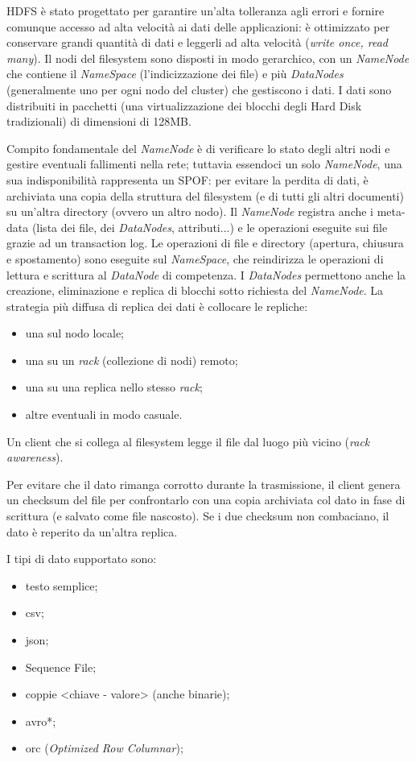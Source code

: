 \documentclass[a4page, 11pt]{article}
\begin{document}
HDFS è stato progettato per garantire un'alta tolleranza agli errori e fornire comunque accesso ad alta velocità ai dati delle applicazioni: è ottimizzato per conservare grandi quantità di dati e leggerli ad alta velocità (\textit{write once, read many}).
Il nodi del filesystem sono disposti in modo gerarchico, con un \textit{NameNode} che contiene il \textit{NameSpace} (l'indicizzazione dei file) e più \textit{DataNodes} (generalmente uno per ogni nodo del cluster) che gestiscono i dati.
I dati sono distribuiti in pacchetti (una virtualizzazione dei blocchi degli Hard Disk tradizionali) di dimensioni di 128MB.

Compito fondamentale del \textit{NameNode} è di verificare lo stato degli altri nodi e gestire eventuali fallimenti nella rete; tuttavia essendoci un solo \textit{NameNode}, una sua indisponibilità rappresenta un SPOF: per evitare la perdita di dati, è archiviata una copia della struttura del filesystem (e di tutti gli altri documenti) su un'altra directory (ovvero un altro nodo).
Il \textit{NameNode} registra anche i meta-data (lista dei file, dei \textit{DataNodes}, attributi...) e le operazioni eseguite sui file grazie ad un transaction log.
Le operazioni di file e directory (apertura, chiusura e spostamento) sono eseguite sul \textit{NameSpace}, che reindirizza le operazioni di lettura e scrittura al \textit{DataNode} di competenza.
I \textit{DataNodes} permettono anche la creazione, eliminazione e replica di blocchi sotto richiesta del \textit{NameNode}.
La strategia più diffusa di replica dei dati è collocare le repliche:
\begin{itemize}
\item una sul nodo locale;
\item una su un \textit{rack} (collezione di nodi) remoto;
\item una su una replica nello stesso \textit{rack};
\item altre eventuali in modo casuale.
\end{itemize}
Un client che si collega al filesystem legge il file dal luogo più vicino (\textit{rack awareness}).

Per evitare che il dato rimanga corrotto durante la trasmissione, il client genera un checksum del file per confrontarlo con una copia archiviata col dato in fase di scrittura (e salvato come file nascosto).
Se i due checksum non combaciano, il dato è reperito da un'altra replica.

I tipi di dato supportato sono:
\begin{itemize}
\item testo semplice;
\item csv;
\item json;
\item Sequence File;
\item coppie \textless{}chiave - valore\textgreater{} (anche binarie);
\item avro*;
\item orc (\textit{Optimized Row Columnar});
\end{itemize}
\end{document}
